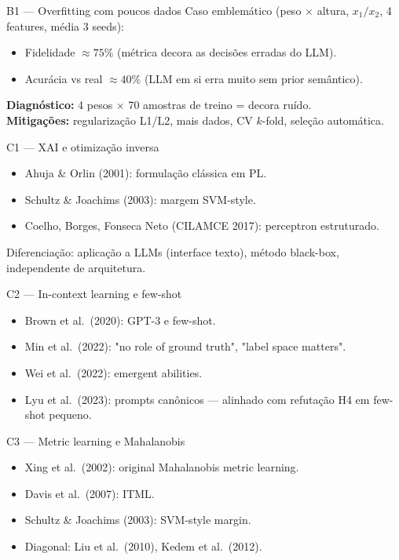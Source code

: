 \documentclass[aspectratio=169,10pt]{beamer}
\begin{document}
\begin{frame}{B1 --- Overfitting com poucos dados}
  \footnotesize
  Caso emblem\'atico (peso $\times$ altura, $x_1/x_2$, 4 features, m\'edia 3 seeds):
  \begin{itemize}
    \item Fidelidade $\approx 75\%$ (m\'etrica decora as decis\~oes erradas do LLM).
    \item Acur\'acia vs real $\approx 40\%$ (LLM em si erra muito sem prior sem\^antico).
  \end{itemize}
  \textbf{Diagn\'ostico:} 4 pesos $\times$ 70 amostras de treino = decora ru\'ido.\\
  \textbf{Mitiga\c{c}\~oes:} regulariza\c{c}\~ao L1/L2, mais dados, CV $k$-fold, sele\c{c}\~ao autom\'atica.
\end{frame}

\begin{frame}{C1 --- XAI e otimiza\c{c}\~ao inversa}
  \footnotesize
  \begin{itemize}
    \item Ahuja \& Orlin (2001): formula\c{c}\~ao cl\'assica em PL.
    \item Schultz \& Joachims (2003): margem SVM-style.
    \item Coelho, Borges, Fonseca Neto (CILAMCE 2017): perceptron estruturado.
  \end{itemize}
  Diferencia\c{c}\~ao: aplica\c{c}\~ao a LLMs (interface texto), m\'etodo black-box, independente de arquitetura.
\end{frame}

\begin{frame}{C2 --- In-context learning e few-shot}
  \footnotesize
  \begin{itemize}
    \item Brown et al.\ (2020): GPT-3 e few-shot.
    \item Min et al.\ (2022): "no role of ground truth", "label space matters".
    \item Wei et al.\ (2022): emergent abilities.
    \item Lyu et al.\ (2023): prompts can\^onicos --- alinhado com refuta\c{c}\~ao H4 em few-shot pequeno.
  \end{itemize}
\end{frame}

\begin{frame}{C3 --- Metric learning e Mahalanobis}
  \footnotesize
  \begin{itemize}
    \item Xing et al.\ (2002): original Mahalanobis metric learning.
    \item Davis et al.\ (2007): ITML.
    \item Schultz \& Joachims (2003): SVM-style margin.
    \item Diagonal: Liu et al.\ (2010), Kedem et al.\ (2012).
  \end{itemize}
\end{frame}
\end{document}
